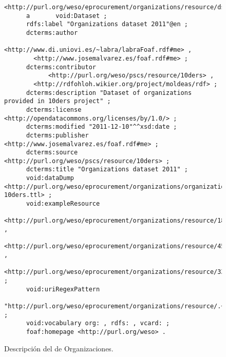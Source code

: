\begin{figure}[!htp]
\begin{lstlisting} 
<http://purl.org/weso/eprocurement/organizations/resource/ds>
      a       void:Dataset ;
      rdfs:label "Organizations dataset 2011"@en ;
      dcterms:author 
            <http://www.di.uniovi.es/~labra/labraFoaf.rdf#me> , 
	    <http://www.josemalvarez.es/foaf.rdf#me> ;
      dcterms:contributor
            <http://purl.org/weso/pscs/resource/10ders> ,
	    <http://rdfohloh.wikier.org/project/moldeas/rdf> ;
      dcterms:description "Dataset of organizations provided in 10ders project" ;
      dcterms:license <http://opendatacommons.org/licenses/by/1.0/> ;
      dcterms:modified "2011-12-10"^^xsd:date ;
      dcterms:publisher <http://www.josemalvarez.es/foaf.rdf#me> ;
      dcterms:source <http://purl.org/weso/pscs/resource/10ders> ;
      dcterms:title "Organizations dataset 2011" ;
      void:dataDump <http://purl.org/weso/eprocurement/organizations/organizations-10ders.ttl> ;
      void:exampleResource
        <http://purl.org/weso/eprocurement/organizations/resource/18000000> , 
	<http://purl.org/weso/eprocurement/organizations/resource/45000000> , 
	<http://purl.org/weso/eprocurement/organizations/resource/33000000> ;
      void:uriRegexPattern
        "http://purl.org/weso/eprocurement/organizations/resource/.+" ;
      void:vocabulary org: , rdfs: , vcard: ;
      foaf:homepage <http://purl.org/weso> .
\end{lstlisting}
	\caption{Descripción del \dataset de Organizaciones.}
	\label{fig:orgs-ds}
\end{figure}

